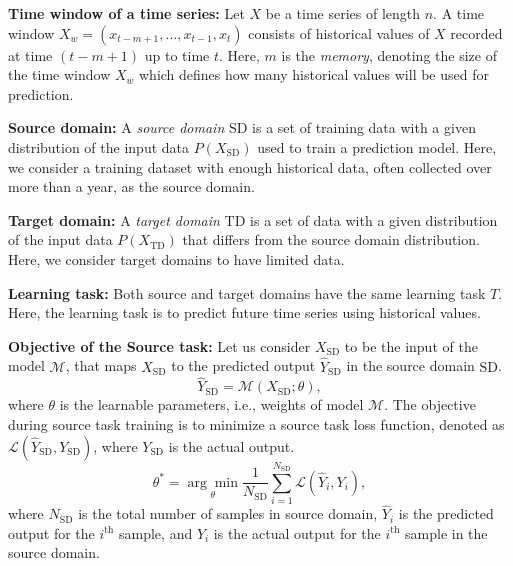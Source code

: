 \documentclass[letterpaper]{article} %
\begin{document}
\textbf{Time window of a time series:}
Let $X$ be a time series of length $n$. A time window $X_w = (x_{t-m+1},\ldots, x_{t-1}, x_t)$ consists of historical values of $X$ recorded at time $(t-m+1)$ up to time $t$. Here, $m$ is the \emph{memory}, denoting the size of the time window $X_w$ which defines how many historical values will be used for prediction.

\textbf{Source domain:}  A \emph{source domain} $\mathrm{SD}$ is a set of training data with a given distribution of the input data $P(X_{\mathrm{SD}})$ used to train a prediction model. Here, we consider a training dataset with enough historical data, often collected over more than a year, as the source domain.

\textbf{Target domain:} A \emph{target domain} $\mathrm{TD}$ is a set of data with a given  distribution of the input data $P(X_{\mathrm{TD}})$ that differs from the source domain distribution. Here, we consider target domains to have limited data.

\textbf{Learning task:} Both source and target domains have the same learning task $T$. Here, the learning task is to predict future time series using historical values.

\textbf{Objective of the Source task:} Let us consider $X_{\mathrm{SD}}$ to be the input of the model $\mathcal{M}$, that maps $X_{\mathrm{SD}}$ to the predicted output $\hat{Y}_{\mathrm{SD}}$ in the source domain $\mathrm{SD}$.
\begin{equation}
   \hat{Y}_{\mathrm{SD}} = \mathcal{M}(X_{\mathrm{SD}};\theta),
\end{equation}
where $\theta$ is the learnable parameters, i.e., weights of model $\mathcal{M}$. The objective during source task training is to minimize a source task loss function, denoted as $\mathcal{L}(\hat{Y}_{\mathrm{SD}}, Y_{\mathrm{SD}})$, where $Y_{\mathrm{SD}}$ is the actual output.
\begin{equation}
    \theta^* = \underset{\theta}{\arg\min}\frac{1}{N_{\mathrm{SD}}} \sum_{i=1}^{N_{\mathrm{SD}}} \mathcal{L}(\hat{Y}_{i}, Y_{i}),
\end{equation}
where $N_{\mathrm{SD}}$ is the total number of samples in source domain, $\hat{Y}_{i}$ is the predicted output for the $i^{\text{th}}$ sample, and ${Y}_{i}$ is the actual output for the $i^{\text{th}}$ sample in the source domain.
\end{document}
